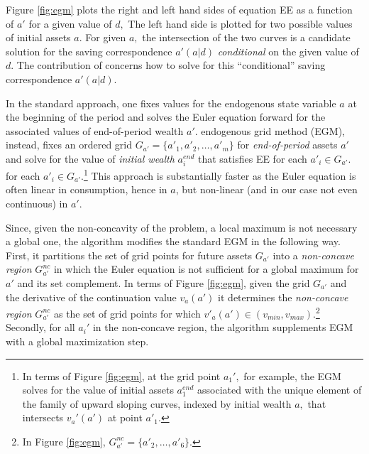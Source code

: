 \documentclass[a4paper,dvips,12pt]{article}
\begin{document}
Figure \ref{fig:egm} plots the right and left hand sides of equation EE as a
function of $a'$ for a given value of $d,$ The left hand side is plotted
for two possible values of initial assets $a.$ For given $a,$ the
intersection of the two curves is a candidate solution for the saving
correspondence $a'(a|d)$ \emph{conditional} on the given value of $d.$
The contribution of  concerns how to solve for
this ``conditional'' saving correspondence $a'(a|d)$.

In the standard approach, one fixes values for the endogenous state
variable $a$ at the beginning of the period and solves the Euler
equation forward for the associated values of end-of-period wealth
$a'$.  endogenous grid method (EGM),
instead, fixes an ordered grid $G_{a'}=\{a'_{1},a'_{2},\ldots, a'_{m}\}$
for \emph{end-of-period} assets $a'$ and solve for the value of
\emph{initial wealth} $a^{end}_{i}$ that satisfies EE for each
$a'_{i}\in G_{a'}.$ for each $a'_{i}\in G_{a'}.$\footnote{In terms of
  Figure  \ref{fig:egm}, at the grid point $a_{1}',$ for example, the EGM
  solves for the value of initial assets $a_{1}^{end}$ associated with
  the unique element of the family of upward sloping curves, indexed by
  initial wealth $a,$ that intersects $v_{a}'(a')$ at point $a'_{1}.$}
This approach is substantially faster as the Euler equation is often
linear in consumption, hence in $a$, but non-linear (and in our case not
even continuous) in $a'$.

Since, given the non-concavity of the problem, a local maximum is not
necessary a global one, the algorithm modifies the standard EGM in the
following way. First, it partitions the set of grid points for future
assets $G_{a'}$ into a \emph{non-concave region} $G_{a'}^{nc}$ in which
the Euler equation is not sufficient for a global maximum for $a'$ and
its set complement.  In terms of Figure   \ref{fig:egm}, given the grid
$G_{a'}$ and the derivative of the continuation value $v_{a}(a')$ it
determines the \emph{non-concave region} $G_{a'}^{nc}$ as the set of
grid points for which $v'_{a}(a')\in(v_{min},v_{max}).$\footnote{In
Figure \ref{fig:egm}, $G_{a'}^{nc}=\{a'_{2},\ldots,a'_{6}\}.$ }
Secondly, for all $a_{i}'$ in the non-concave region, the algorithm
supplements EGM with a global maximization step.
\end{document}
